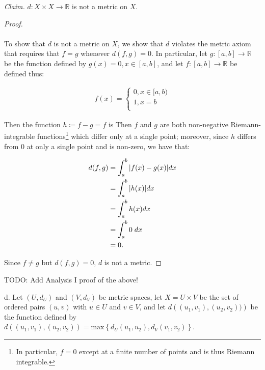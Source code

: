     \emph{Claim.} $d: X \times X \to \mathbb{R}$ is not a metric on $X$.
    \ \\

    \begin{proof}\ \\\\
        To show that $d$ is not a metric on $X$, we show that $d$ violates the metric axiom that requires
        that $f = g$ whenever $d(f, g) = 0$. In particular, let $g:[a, b] \to \mathbb{R}$ be the function defined
        by $g(x) = 0, x \in [a, b]$, and let $f:[a, b] \to \mathbb{R}$ be defined thus:

        \begin{align*}
            f(x) = \begin{cases}
                0, x \in [a, b) \\
                1, x = b \\
            \end{cases}
        \end{align*}

        Then the function $h \coloneqq f - g = f$ is 
        Then $f$ and $g$ are both non-negative Riemann-integrable functions\footnote{
            In particular, $f = 0$ except at a finite number of points and is thus Riemann integrable.
        } which differ only at a single point; moreover, since $h$ differs from 0 at only a single point
        and is non-zero, we have that:
        
        \begin{align*}
            d(f, g) &= \int_a^b{|f(x) - g(x)|dx} \\
                    &= \int_a^b{|h(x)|dx} \\
                    &= \int_a^b{h(x) dx} \\
                    &= \int_a^b{0 \hspace{1mm} dx} \\
                    &= 0.
        \end{align*}

        Since $f \neq g$ but $d(f, g) = 0$, $d$ is not a metric.
            
    \end{proof}

    TODO: Add Analysis I proof of the above!

    \pagebreak

d.  Let $(U, d_U)$ and $(V, d_V)$ be metric spaces, let $X = U \times V$
    be the set of ordered pairs $(u, v)$ with $u \in U$ and $v \in V$, and
    let $d\left((u_1, v_1), (u_2, v_2))\right)$ be the function defined by
    $d\left((u_1, v_1), (u_2, v_2)\right) 
     = \text{max}\left\{d_U(u_1, u_2), d_V(v_1, v_2)\right\}$. \ \\
    
